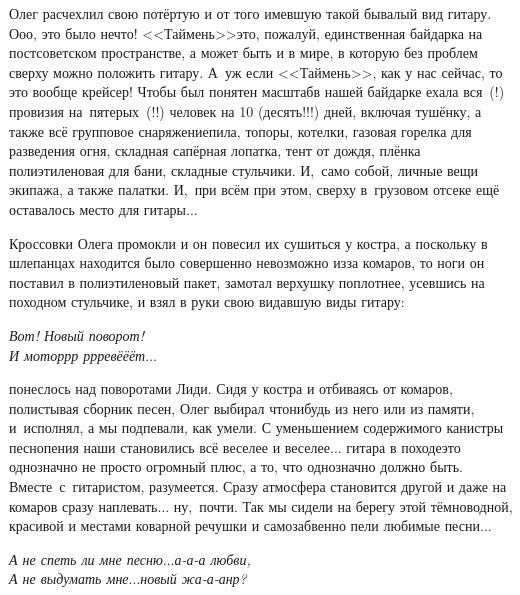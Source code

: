 Олег расчехлил свою потёртую и от того имевшую такой бывалый вид гитару. О\sdash о\sdash о, это было нечто! <<Таймень>>\mdash это, пожалуй, единственная байдарка на постсоветском пространстве, а может быть и в мире, в которую без проблем сверху можно положить гитару. А~уж если <<Таймень>>, как у нас сейчас, то это вообще крейсер! Чтобы был понятен масштаб\mdash в нашей байдарке ехала вся~(!) провизия на~пятерых~(!!) человек на 10 (десять!!!) дней, включая тушёнку, а также всё групповое снаряжение\mdash пила, топоры, котелки, газовая горелка для разведения огня, складная сапёрная лопатка, тент от дождя, плёнка полиэтиленовая для бани, складные стульчики. И,~само собой, личные вещи экипажа, а также палатки. И,~при всём при этом, сверху в~грузовом отсеке ещё оставалось место для гитары$\ldots$

Кроссовки Олега промокли и он повесил их сушиться у костра, а поскольку в шлепанцах находится было совершенно невозможно из\sdash за комаров, то ноги он поставил в полиэтиленовый пакет, замотал верхушку поплотнее, усевшись на походном стульчике, и взял в руки свою видавшую виды гитару:

\vspace{0.1cm}
\noindent\textit{%
	\hspace*{3.5cm}Вот! Новый поворот!\\
	\hspace*{3.5cm}И мотор\sdash р\sdash р  р\sdash р\sdash ревё\sdash ё\sdash ёт$\ldots$
}
\vspace{0.1cm}

\noindent\mdash понеслось над поворотами Лиди. Сидя у костра и отбиваясь от комаров, полистывая сборник песен, Олег выбирал что\sdash нибудь из него или из памяти, и~исполнял, а мы подпевали, как умели. С уменьшением содержимого канистры песнопения наши становились всё веселее и веселее$\ldots$ гитара в походе\mdash это однозначно не просто огромный плюс, а то, что однозначно должно быть. Вместе~с~гитаристом, разумеется. Сразу атмосфера становится другой и даже на комаров сразу наплевать$\ldots$ ну,~почти. Так мы сидели на берегу этой тёмноводной, красивой и местами коварной речушки и самозабвенно пели любимые песни$\ldots$

\vspace{0.1cm}
\noindent\textit{%
	\hspace*{2.0cm}А не спеть ли мне песню$\ldots$а-а-а любви,\\
	\hspace*{2.0cm}А не выдумать мне$\ldots$новый жа-а-анр?
}


